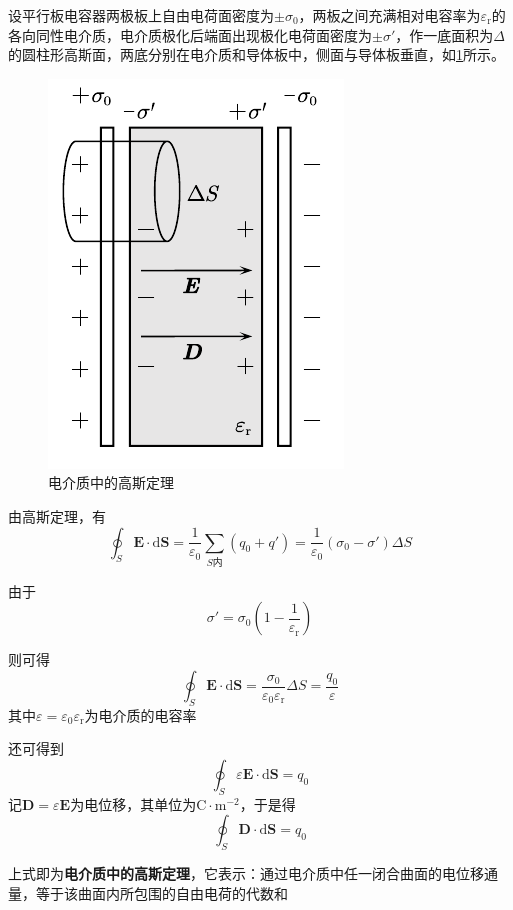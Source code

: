 \documentclass[12pt, a4paper, twoside]{ctexbook}
\begin{document}
设平行板电容器两极板上自由电荷面密度为$\pm\sigma_0$，两板之间充满相对电容率为$\varepsilon_{\mathrm{r}}$的各向同性电介质，电介质极化后端面出现极化电荷面密度为$\pm\sigma'$，作一底面积为$\Delta$的圆柱形高斯面，两底分别在电介质和导体板中，侧面与导体板垂直，如\textcolor{blue}{\cref{fig:电介质中的高斯定理}}所示。
\begin{figure}[H]
    \centerline{\includegraphics[scale=1.0]{电介质中的高斯定理.pdf}}
    \caption{电介质中的高斯定理}\label{fig:电介质中的高斯定理}
\end{figure}
由高斯定理，有
$$
\oint_S \boldsymbol{E}\cdot\mathrm{d}\boldsymbol{S}=\frac{1}{\varepsilon_0}\sum_{S\text{内}}\left(q_0+q'\right)=\frac{1}{\varepsilon_0}\left(\sigma_0-\sigma'\right)\Delta S
$$

由于
$$
\sigma'=\sigma_0\left(1-\frac{1}{\varepsilon_{\mathrm{r}}}\right)
$$

则可得
$$
\oint_S \boldsymbol{E}\cdot\mathrm{d}\boldsymbol{S}=\frac{\sigma_0}{\varepsilon_0\varepsilon_{\mathrm{r}}}\Delta S=\frac{q_0}{\varepsilon}
$$
其中$\varepsilon=\varepsilon_0\varepsilon_{\mathrm{r}}$为电介质的电容率

还可得到
$$
\oint_S \varepsilon\boldsymbol{E}\cdot\mathrm{d}\boldsymbol{S}=q_0
$$
记$\boldsymbol{D}=\varepsilon\boldsymbol{E}$为电位移，其单位为$\mathrm{C}\cdot\mathrm{m}^{-2}$，于是得
$$
\oint_S \boldsymbol{D}\cdot\mathrm{d}\boldsymbol{S}=q_0
$$

上式即为\textbf{电介质中的高斯定理}，它表示：通过电介质中任一闭合曲面的电位移通量，等于该曲面内所包围的自由电荷的代数和
\end{document}
